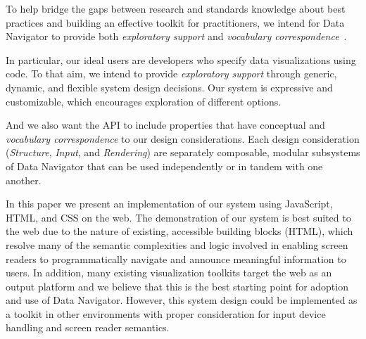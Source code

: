 \documentclass[journal]{vgtc}                %
\begin{document}
To help bridge the gaps between research and standards knowledge about best practices and building an effective toolkit for practitioners, we intend for Data Navigator to provide both \textit{exploratory support} and \textit{vocabulary correspondence}~\cite{Maayan2020Domain}.

In particular, our ideal users are developers who specify data visualizations using code. To that aim, we intend to provide \textit{exploratory support} through generic, dynamic, and flexible system design decisions. Our system is expressive and customizable, which encourages exploration of different options.

And we also want the API to include properties that have conceptual and \textit{vocabulary correspondence} to our design considerations. Each design consideration (\textit{Structure}, \textit{Input}, and \textit{Rendering}) are separately composable, modular subsystems of Data Navigator that can be used independently or in tandem with one another.



In this paper we present an implementation of our system using JavaScript, HTML, and CSS on the web. The demonstration of our system is best suited to the web due to the nature of existing, accessible building blocks (HTML), which resolve many of the semantic complexities and logic involved in enabling screen readers to programmatically navigate and announce meaningful information to users. In addition, many existing visualization toolkits target the web as an output platform and we believe that this is the best starting point for adoption and use of Data Navigator. However, this system design could be implemented as a toolkit in other environments with proper consideration for input device handling and screen reader semantics.
\end{document}
